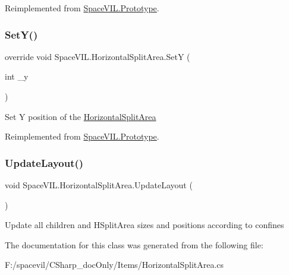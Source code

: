 Reimplemented from \mbox{\hyperlink{class_space_v_i_l_1_1_prototype_ae96644a6ace490afb376fb542161e541}{Space\+V\+I\+L.\+Prototype}}.

\mbox{\label{class_space_v_i_l_1_1_horizontal_split_area_a49f19dd9999b4ab40def3b69b2682973}} 
\subsubsection{\texorpdfstring{Set\+Y()}{SetY()}}
{\footnotesize\ttfamily override void Space\+V\+I\+L.\+Horizontal\+Split\+Area.\+SetY (\begin{DoxyParamCaption}\item[{int}]{\+\_\+y }\end{DoxyParamCaption})\hspace{0.3cm}{\ttfamily [virtual]}}



Set Y position of the \mbox{\hyperlink{class_space_v_i_l_1_1_horizontal_split_area}{Horizontal\+Split\+Area}} 



Reimplemented from \mbox{\hyperlink{class_space_v_i_l_1_1_prototype}{Space\+V\+I\+L.\+Prototype}}.

\mbox{\label{class_space_v_i_l_1_1_horizontal_split_area_a17787a6998374e9fea24a7a7a466be42}} 
\subsubsection{\texorpdfstring{Update\+Layout()}{UpdateLayout()}}
{\footnotesize\ttfamily void Space\+V\+I\+L.\+Horizontal\+Split\+Area.\+Update\+Layout (\begin{DoxyParamCaption}{ }\end{DoxyParamCaption})}



Update all children and H\+Split\+Area sizes and positions according to confines 



The documentation for this class was generated from the following file\+:\begin{DoxyCompactItemize}
\item 
F\+:/spacevil/\+C\+Sharp\+\_\+doc\+Only/\+Items/Horizontal\+Split\+Area.\+cs\end{DoxyCompactItemize}
